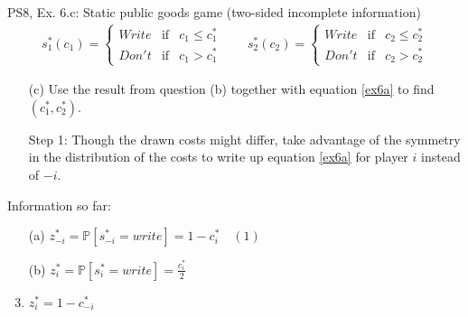 \begin{frame}{PS8, Ex. 6.c: Static public goods game (two-sided incomplete information)}
    \begin{align*}
      s_1^*(c_1)=\left\{\begin{array}{rcl}
        Write & \text{if} & c_1\leq c_1^*\\
        Don't & \text{if} & c_1>c_1^*
        \end{array}\right.\quad\quad
      s_2^*(c_2)=\left\{\begin{array}{rcl}
        Write & \text{if} & c_2\leq c_2^*\\
        Don't & \text{if} & c_2>c_2^*
        \end{array}\right.
    \end{align*}
    \vspace{-12pt}
    \begin{itemize}
      \item[(c)] Use the result from question (b) together with equation \eqref{ex6a} to find $(c_1^* , c_2^*)$.
    \end{itemize}
    \begin{multicols}{2}
      \begin{itemize}
        \item[Step 1:] Though the drawn costs might differ, take advantage of the symmetry in the distribution of the costs to write up equation \eqref{ex6a} for player $i$ instead of $-i$.
      \end{itemize}
      \vfill\null\columnbreak
      Information so far:
      \begin{enumerate}
        \item[(a)] $z_{-i}^*=\mathbb{P}[s_{-i}^*=write]=1-c_i^*\quad(1)$
        \item[(b)] $z_i^*=\mathbb{P}[s_i^*=write]=\frac{c_i^*}{2}$
        \item      $z_i^*=1-c_{-i}^*$
      \end{enumerate}
      \vfill\null
    \end{multicols}
\end{frame}
